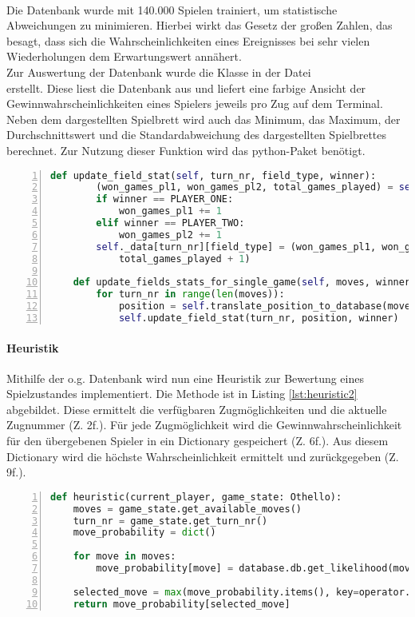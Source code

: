 \\Die Datenbank wurde mit 140.000 Spielen trainiert, um statistische Abweichungen zu minimieren. Hierbei wirkt das Gesetz der großen Zahlen, das besagt, dass sich die Wahrscheinlichkeiten eines Ereignisses bei sehr vielen Wiederholungen dem Erwartungswert annähert.
\\Zur Auswertung der Datenbank wurde die Klasse  in der Datei \\ erstellt. Diese liest die Datenbank aus und liefert eine farbige Ansicht der Gewinnwahrscheinlichkeiten eines Spielers jeweils pro Zug auf dem Terminal. Neben dem dargestellten Spielbrett wird auch das Minimum, das Maximum, der Durchschnittswert und die Standardabweichung des dargestellten Spielbrettes berechnet. Zur Nutzung dieser Funktion wird das python-Paket  benötigt.
\begin{lstlisting}[basicstyle=\footnotesize, caption = {Befüllen der Datenbank 2}, language = python, captionpos = t , numbers=left, label={lst:train2}]
	def update_field_stat(self, turn_nr, field_type, winner):
		(won_games_pl1, won_games_pl2, total_games_played) = self._data[turn_nr][field_type]
		if winner == PLAYER_ONE:
			won_games_pl1 += 1
		elif winner == PLAYER_TWO:
			won_games_pl2 += 1
		self._data[turn_nr][field_type] = (won_games_pl1, won_games_pl2, 
			total_games_played + 1)

	def update_fields_stats_for_single_game(self, moves, winner):
		for turn_nr in range(len(moves)):
			position = self.translate_position_to_database(moves[turn_nr])
			self.update_field_stat(turn_nr, position, winner)
\end{lstlisting}

\paragraph{Heuristik}
\label{para:heuristic1}
Mithilfe der o.g. Datenbank wird  nun eine Heuristik zur Bewertung eines Spielzustandes implementiert. Die Methode  ist in Listing \ref{lst:heuristic2} abgebildet. Diese ermittelt die verfügbaren Zugmöglichkeiten und die aktuelle Zugnummer (Z. 2f.). Für jede Zugmöglichkeit wird die Gewinnwahrscheinlichkeit für den übergebenen Spieler in ein Dictionary gespeichert (Z. 6f.). Aus diesem Dictionary wird die höchste Wahrscheinlichkeit ermittelt und zurückgegeben (Z. 9f.).
\begin{lstlisting}[basicstyle=\footnotesize, caption = {Stored Monte-Carlo-Heuristik Funktion}, language = python, captionpos = t , numbers=left, label={lst:heuristic2}]
def heuristic(current_player, game_state: Othello):
	moves = game_state.get_available_moves()
	turn_nr = game_state.get_turn_nr()
	move_probability = dict()

	for move in moves:
		move_probability[move] = database.db.get_likelihood(move, turn_nr, current_player)

	selected_move = max(move_probability.items(), key=operator.itemgetter(1))[0]
 	return move_probability[selected_move]
\end{lstlisting}

